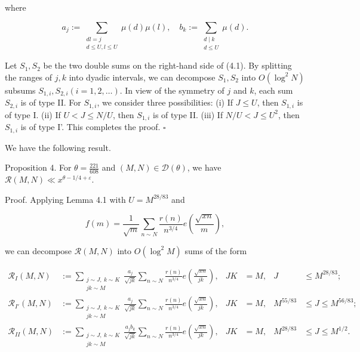 \documentclass[10pt]{article}
\begin{document}
where

$$
a_{j}:=\sum_{\substack{d l=j \\ d \leqslant U, l \leqslant U}} \mu(d) \mu(l), \quad b_{k}:=\sum_{\substack{d \mid k \\ d \leqslant U}} \mu(d) .
$$

Let $S_1,S_2$ be the two double sums on the right-hand side of (4.1). By splitting the ranges of $j, k$ into dyadic intervals, we can decompose $S_{1}, S_{2}$ into $O\left(\log ^{2} N\right)$ subsums $S_{1, i}, S_{2, i}(i=1,2, \ldots)$. In view of the symmetry of $j$ and $k$, each sum $S_{2, i}$ is of type II. For $S_{1,i}$, we consider three possibilities: (i) If $J \leqslant U$, then $S_{1, i}$ is of type I. (ii) If $U<J \leqslant N / U$, then $S_{1, i}$ is of type II. (iii) If $N / U<J \leqslant U^{2}$, then $S_{1, i}$ is of type I'. This completes the proof. \(\square\)

We have the following result.

Proposition 4. For $\theta=\frac{221}{608}$ and $(M, N) \in \mathscr{D}(\theta)$, we have $\mathscr{R}(M, N) \ll x^{\theta-1 / 4+\varepsilon}$.

Proof. Applying Lemma 4.1 with $U=M^{28 / 83}$ and

$$
f(m)=\frac{1}{\sqrt{m}} \sum_{n \sim N} \frac{r(n)}{n^{3 / 4}} e\left(\frac{\sqrt{x n}}{m}\right),
$$

we can decompose $\mathscr{R}(M, N)$ into $O\left(\log ^{2} M\right)$ sums of the form

\[
\begin{aligned}
\mathscr R_I(M,N)&:=
\sum_{\substack{j\sim J,\ k\sim K\\jk\sim M}}
\frac{a_j}{\sqrt{jk}}\sum_{n\sim N}\frac{r(n)}{n^{3/4}}
 e\left(\frac{\sqrt{xn}}{jk}\right),
& JK&=M, & J&\leqslant M^{28/83};\\
\mathscr R_{I'}(M,N)&:=
\sum_{\substack{j\sim J,\ k\sim K\\jk\sim M}}
\frac{a_j}{\sqrt{jk}}\sum_{n\sim N}\frac{r(n)}{n^{3/4}}
 e\left(\frac{\sqrt{xn}}{jk}\right),
& JK&=M, & M^{55/83}&\leqslant J\leqslant M^{56/83};\\
\mathscr R_{II}(M,N)&:=
\sum_{\substack{j\sim J,\ k\sim K\\jk\sim M}}
\frac{a_jb_k}{\sqrt{jk}}\sum_{n\sim N}\frac{r(n)}{n^{3/4}}
 e\left(\frac{\sqrt{xn}}{jk}\right),
& JK&=M, & M^{28/83}&\leqslant J\leqslant M^{1/2}.
\end{aligned}
\]
\end{document}
